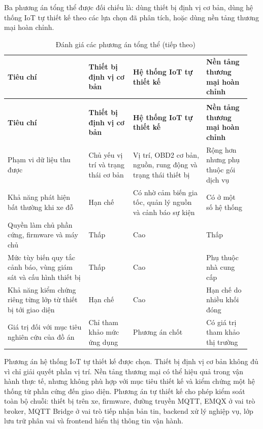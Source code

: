 \documentclass[a4paper]{extarticle}
\newcommand{\thesissettableid}[2]{%
  \renewcommand{\thetable}{#1}%
  \renewcommand{\theHtable}{#2}%
}
\begin{document}
Ba phương án tổng thể được đối chiếu là: dùng thiết bị định vị cơ bản, dùng hệ
thống IoT tự thiết kế theo các lựa chọn đã phân tích, hoặc dùng nền tảng thương
mại hoàn chỉnh.

{\thesissettableid{3.43}{condensed-bang-3-43-danh-gia-cac-phuong-an-tong-the}
\def\LTcaptype{table}
\begin{longtable}{|L{0.314\linewidth}|L{0.175\linewidth}|L{0.287\linewidth}|L{0.175\linewidth}|}
\caption{Đánh giá các phương án tổng thể}\label{tab:condensed-bang-3-43-danh-gia-cac-phuong-an-tong-the}\\
\hline
\textbf{Tiêu chí} & \textbf{Thiết bị định vị cơ bản} & \textbf{Hệ thống IoT tự thiết kế} & \textbf{Nền tảng thương mại hoàn chỉnh} \\
\hline
\endfirsthead
\caption[]{Đánh giá các phương án tổng thể (tiếp theo)}\\
\hline
\textbf{Tiêu chí} & \textbf{Thiết bị định vị cơ bản} & \textbf{Hệ thống IoT tự thiết kế} & \textbf{Nền tảng thương mại hoàn chỉnh} \\
\hline
\endhead
\endfoot
\endlastfoot
Phạm vi dữ liệu thu được & Chủ yếu vị trí và trạng thái cơ bản & Vị trí, OBD2 cơ bản, nguồn, rung động và trạng thái thiết bị & Rộng hơn nhưng phụ thuộc gói dịch vụ \\\hline
Khả năng phát hiện bất thường khi xe đỗ & Hạn chế & Có nhờ cảm biến gia tốc, quản lý nguồn và cảnh báo sự kiện & Có ở một số hệ thống \\\hline
Quyền làm chủ phần cứng, firmware và máy chủ & Thấp & Cao & Thấp \\\hline
Mức tùy biến quy tắc cảnh báo, vùng giám sát và cấu hình thiết bị & Thấp & Cao & Phụ thuộc nhà cung cấp \\\hline
Khả năng kiểm chứng riêng từng lớp từ thiết bị tới giao diện & Hạn chế & Cao & Hạn chế do nhiều khối đóng \\\hline
Giá trị đối với mục tiêu nghiên cứu của đồ án & Chỉ tham khảo mức ứng dụng & Phương án chốt & Có giá trị tham khảo thị trường \\\hline
\end{longtable}
}

Phương án hệ thống IoT tự thiết kế được chọn. Thiết bị định vị cơ bản không đủ
vì chỉ giải quyết phần vị trí. Nền tảng thương mại có thể hiệu quả trong vận
hành thực tế, nhưng không phù hợp với mục tiêu thiết kế và kiểm chứng một hệ
thống từ phần cứng đến giao diện. Phương án tự thiết kế cho phép kiểm soát toàn
bộ chuỗi: thiết bị trên xe, firmware, đường truyền MQTT, EMQX ở vai trò broker,
MQTT Bridge ở vai trò tiếp nhận bản tin, backend xử lý nghiệp vụ, lớp lưu trữ
phân vai và frontend hiển thị thông tin vận hành.
\end{document}
